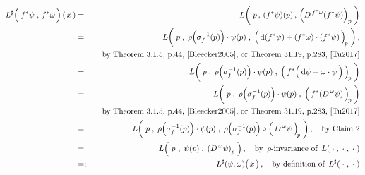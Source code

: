 \begin{enumerate}
    \vskip 0.3cm
    \begin{eqnarray*}
    L^{\sharp}\!\left(\;
        \overset{{\color{white}.}}{f^{*}\psi}
        \;,\,
        f^{*}\omega
        \,\right)(\,x\,)
    & = &
        L\!\left(\;
            p
            \,,\,
            (f^{*}\psi)(p)
            \,,\,
            \left(D^{\,f^{*}\omega}(f^{*}\psi)\right)_{p}
            \;\right)
    \\
    & = &
        L\!\left(\;
            p
            \;,\;
            \rho\!\left(\sigma_{f}^{-1}(p)\right)\cdot\psi(p)
            \;,\;
            \left(\,
                \d(f^{*}\psi)
                \overset{{\color{white}.}}{+}
                (f^{*}\omega) \cdot (f^{*}\psi)
                \,\right)_{\!p}
            \;\right),
    \\
    &&
        \quad
        \textnormal{by Theorem 3.1.5, p.44, \cite{Bleecker2005}, or Theorem 31.19, p.283, \cite{Tu2017}}
    \\
    & = &
        L\!\left(\;
            p
            \;,\;
            \rho\!\left(\sigma_{f}^{-1}(p)\right)\cdot\psi(p)
            \;,\;
            \left(\,
                f^{*}\!\left(\,
                    \d\psi \overset{{\color{white}.}}{+} \omega \cdot \psi
                    \,\right)
                \,\right)_{\!p}
            \;\right)
    \\
    & = &
        L\!\left(\;
            p
            \;,\;
            \rho\!\left(\sigma_{f}^{-1}(p)\right)\cdot\psi(p)
            \;,\;
            \left(\,\overset{{\color{white}.}}{
                f^{*}\!\left(D^{\,\omega}\psi\right)
                }\,\right)_{\!p}
            \;\right)
    \\
    &&
        \quad
        \textnormal{by Theorem 3.1.5, p.44, \cite{Bleecker2005}, or Theorem 31.19, p.283, \cite{Tu2017}}
    \\
    & = &
        L\!\left(\;
            p
            \;,\;
            \rho\!\left(\sigma_{f}^{-1}(p)\right)\cdot\psi(p)
            \;,\;
            \rho\!\left(\sigma_{f}^{-1}(p)\right)
            \circ
            \left(\,\overset{{\color{white}.}}{
                D^{\,\omega}\psi
                }\,\right)_{\!p}
            \;\right),
        \quad
        \textnormal{by Claim 2}
    \\
    & = &
        L\!\left(\;
            \overset{{\color{white}-}}{p}
            \;,\;
            \psi(p)
            \;,\;
                \left(D^{\,\omega}\psi\right)_{p}
            \;\right),
        \quad
        \textnormal{by \,$\rho$-invariance of \,$L(\;\cdot\;,\;\cdot\;,\;\cdot\;)$}
    \\
    & =: &
        L^{\sharp}(\psi,\omega)\!\left(\,\overset{{\color{white}.}}{x}\,\right),
        \quad
        \textnormal{by definition of \,$L^{\sharp}(\;\cdot\;,\;\cdot\;)$}
    \end{eqnarray*}
\end{enumerate}

